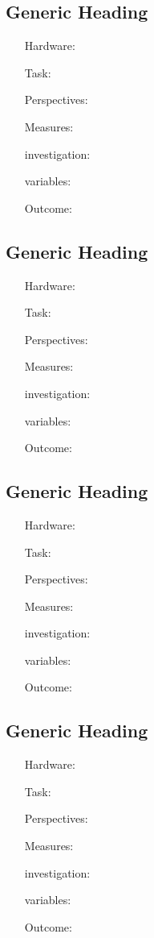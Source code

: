 \subsection{Generic Heading}
\begin{itemize}
	\item[Hardware:] 
	\item[Task:] 
	\item[Perspectives:] 
	\item[Measures:] 
	\item[investigation:] 
	\item[variables:] 
	\item[Outcome:] 
\end{itemize}

\subsection{Generic Heading}
\begin{itemize}
	\item[Hardware:] 
	\item[Task:] 
	\item[Perspectives:] 
	\item[Measures:] 
	\item[investigation:] 
	\item[variables:] 
	\item[Outcome:] 
\end{itemize}

\subsection{Generic Heading}
\begin{itemize}
	\item[Hardware:] 
	\item[Task:] 
	\item[Perspectives:] 
	\item[Measures:] 
	\item[investigation:] 
	\item[variables:] 
	\item[Outcome:] 
\end{itemize}

\subsection{Generic Heading}
\begin{itemize}
	\item[Hardware:] 
	\item[Task:] 
	\item[Perspectives:] 
	\item[Measures:] 
	\item[investigation:] 
	\item[variables:] 
	\item[Outcome:] 
\end{itemize}

